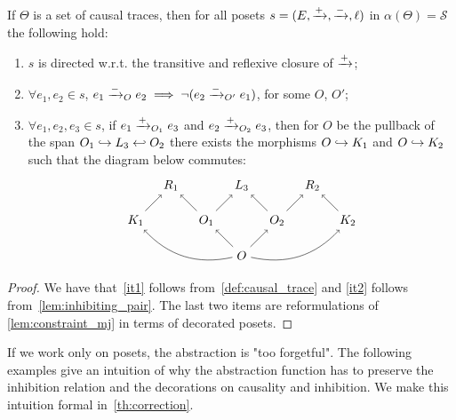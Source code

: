 \begin{property}
  \label{prop:constraints_poset}
  If $\Theta$ is a set of causal traces, then for all posets $s = (E,\mathrel{\xrightarrow{+}},\mathrel{\xrightarrow{-}},\ell)$ in $\alpha(\Theta)=\mathcal{S}$ the following hold:
  \begin{enumerate}
  \item
    \label{it1}
    $s$ is directed w.r.t. the transitive and reflexive closure of $\mathrel{\xrightarrow{+}}$;
  \item
    \label{it2}
    $\forall e_1,e_2\in s$, $e_1\mathrel{\xrightarrow{-}}_O e_2\implies \neg(e_2 \mathrel{\xrightarrow{-}}_{O'} e_1)$, for some $O$, $O'$;
  \item
    \label{it3}
    $\forall e_1,e_2,e_3\in s$, if $e_1\mathrel{\xrightarrow{+}}_{O_1} e_3$ and $e_2\mathrel{\xrightarrow{+}}_{O_2} e_3$, then for $O$ be the pullback of the span $O_1\hookrightarrow L_3 \hookleftarrow O_2$ there exists the morphisms $O\hookrightarrow K_1$ and $O\hookrightarrow K_2$ such that the diagram below commutes:
    \[
    \begin{tikzpicture} %
      \node (o) at (0,-1) {\(O\)};
      \node (r3) at (0,1) {\(L_3\)};
      \node (o1) at (-1,0) {\(O_1\)};
      \node (o2) at (1,0) {\(O_2\)};
      \node (r1) at (-2,1) {\(R_1\)};
      \node (r2) at (2,1) {\(R_2\)};
      \node (k1) at (-3,0) {\(K_1\)};
      \node (k2) at (3,0) {\(K_2\)};
      \draw [->] (o) -- (o1);
      \draw [->] (o) -- (o2);
      \draw [->] (o1) -- (r3);
      \draw [->] (o2) -- (r3);
      \draw [->] (o1) -- (r1);
      \draw [->] (o2) -- (r2);
      \draw [->] (k1) -- (r1);
      \draw [->] (k2) -- (r2);
      \draw [->] (o) to [bend left] (k1);
      \draw [->] (o) to [bend right] (k2);
    \end{tikzpicture}
    \]
  \end{enumerate}
\end{property}
\begin{proof}
  We have that~\autoref{it1} follows from~\autoref{def:causal_trace} and \autoref{it2} follows from~\autoref{lem:inhibiting_pair}. The last two items are reformulations of \autoref{lem:constraint_mj} in terms of decorated posets.
\end{proof}

If we work only on posets, the abstraction is "too forgetful".
The following examples give an intuition of why the abstraction function has to preserve the inhibition relation and the decorations on causality and inhibition.
We make this intuition formal in~\autoref{th:correction}.

